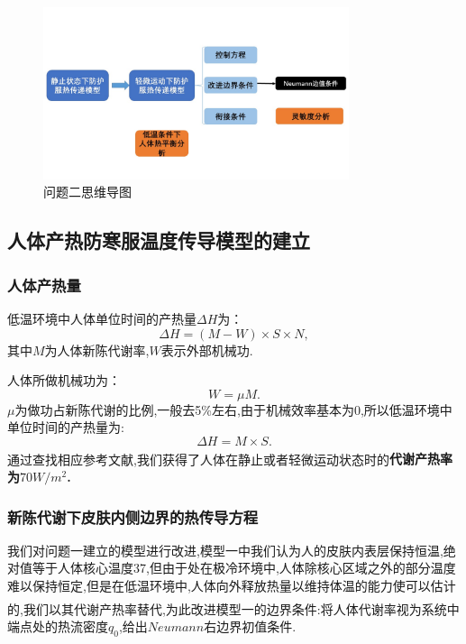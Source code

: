 \documentclass{whutmod}
\newcommand{\upcite}[1]{\textsuperscript{\textsuperscript{\cite{#1}}}}
\begin{document}
\begin{figure}[!htbp]
	\centering
	\includegraphics[width=0.8\textwidth]{mindmap2.jpg}
	\caption{问题二思维导图}
\end{figure}

\subsection{人体产热防寒服温度传导模型的建立}
\subsubsection{人体产热量}
低温环境中人体单位时间的产热量$\Delta H$为：
\begin{equation}
\Delta H=(M-W)\times S\times N,
\end{equation}
其中$M$为人体新陈代谢率,$W$表示外部机械功.

人体所做机械功为：
\begin{equation}
W=\mu M.
\end{equation}
$\mu$为做功占新陈代谢的比例,一般去5\%左右,由于机械效率基本为0,所以低温环境中单位时间的产热量为:
\begin{equation}
\Delta H=M\times S.
\end{equation}
通过查找相应参考文献\upcite{bib:four},我们获得了人体在静止或者轻微运动状态时的\textbf{代谢产热率为$70W/m^{2}$.}



\subsubsection{新陈代谢下皮肤内侧边界的热传导方程}
我们对问题一建立的模型进行改进,模型一中我们认为人的皮肤内表层保持恒温,绝对值等于人体核心温度37\textcelsius ,但由于处在极冷环境中,人体除核心区域之外的部分温度难以保持恒定,但是在低温环境中,人体向外释放热量以维持体温的能力使可以估计的,我们以其代谢产热率替代\upcite{bib:two},为此改进模型一的边界条件:将人体代谢率视为系统中端点处的热流密度$q_0$,给出$Neumann$右边界初值条件.
\end{document}
